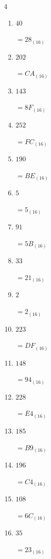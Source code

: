 \begin{multicols}{4}
\begin{enumerate}
        $=DF_{(16)}$

  \item $40$

        $=28_{(16)}$

  \item $202$

        $=CA_{(16)}$

  \item $143$

        $=8F_{(16)}$

  \item $252$

        $=FC_{(16)}$

  \item $190$

        $=BE_{(16)}$

  \item $5$

        $=5_{(16)}$

  \item $91$

        $=5B_{(16)}$

  \item $33$

        $=21_{(16)}$

  \item $2$

        $=2_{(16)}$

\columnbreak %

  \item $223$

        $=DF_{(16)}$

  \item $148$

        $=94_{(16)}$

  \item $228$

        $=E4_{(16)}$

  \item $185$

        $=B9_{(16)}$

  \item $196$

        $=C4_{(16)}$

  \item $108$

        $=6C_{(16)}$

  \item $35$

        $=23_{(16)}$


\end{enumerate}
\end{multicols}
